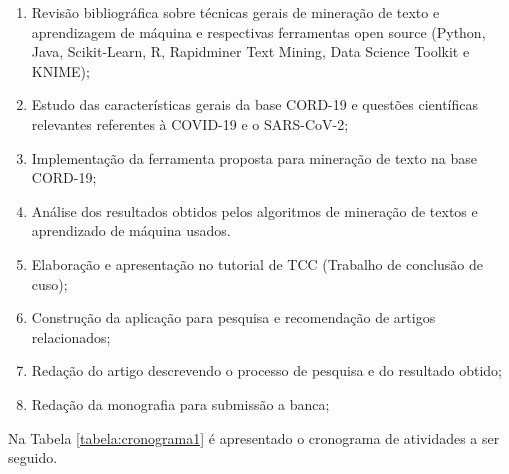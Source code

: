 \documentclass[
	12pt,				%
	a4paper,			%
	english,			%
	brazil,				%
	]{article}
\begin{document}
    \begin{enumerate}

        \item Revis\~ ao bibliogr\' afica sobre t\' ecnicas gerais de minera\c c\~ ao de texto e aprendizagem de m\' aquina e respectivas ferramentas open source (Python, Java, Scikit-Learn, R, Rapidminer Text Mining, Data Science Toolkit e KNIME);\label{a1}
        
        \item Estudo das caracter\' isticas gerais da base CORD-19 e quest\~ oes cient\' ificas relevantes referentes à COVID-19 e o SARS-CoV-2; \label{a2}

        \item Implementa\c c\~ ao da ferramenta proposta para minera\c c\~ ao de texto na base CORD-19;   \label{a3}

        \item An\' alise dos resultados obtidos pelos algoritmos de minera\c c\~ ao de textos e aprendizado de m\' aquina usados.   \label{a4}

        \item Elabora\c c\~ ao e apresenta\c c\~ ao no tutorial de TCC (Trabalho de conclus\~ ao de cuso);  \label{a5}

        \item Constru{\c c}\~ ao da aplica{\c c}\~ ao para pesquisa e recomenda{\c c}\~ ao de artigos relacionados;   \label{a6}

        \item Reda{\c c}\~ ao do artigo descrevendo o processo de pesquisa e do resultado obtido;   \label{a7}

        \item Reda\c c\~ ao da monografia para submiss\~ ao a banca;   \label{a8}
    
\end{enumerate}

    Na Tabela \ref{tabela:cronograma1} \' e apresentado o cronograma de atividades a ser seguido.
 
\end{document}
